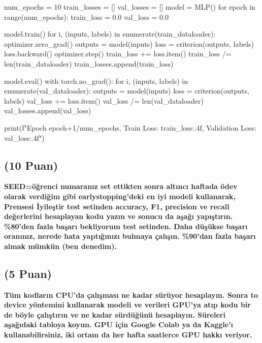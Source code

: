 \documentclass[11pt]{article}
\begin{document}
\begin{python}

 num_epochs = 10
train_losses = []
val_losses = []
model = MLP()
for epoch in range(num_epochs):
    train_loss = 0.0
    val_loss = 0.0
    
    
    model.train()
    for i, (inputs, labels) in enumerate(train_dataloader):
        optimizer.zero_grad()
        outputs = model(inputs)
        loss = criterion(outputs, labels)
        loss.backward()
        optimizer.step()
        train_loss += loss.item()
    train_loss /= len(train_dataloader)
    train_losses.append(train_loss)

    
    model.eval()
    with torch.no_grad():
        for i, (inputs, labels) in enumerate(val_dataloader):
            outputs = model(inputs)
            loss = criterion(outputs, labels)
            val_loss += loss.item()
        val_loss /= len(val_dataloader)
        val_losses.append(val_loss)

   
    print(f"Epoch {epoch+1}/{num_epochs}, Train Loss: {train_loss:.4f}, Validation Loss: {val_loss:.4f}")



\end{python}

\begin{comment}

\begin{figure}[ht!]
 
\end{figure}
\end{comment}

\subsection{(10 Puan)} \textbf{SEED=öğrenci numaranız set ettikten sonra altıncı haftada ödev olarak verdiğim gibi earlystopping'deki en iyi modeli kullanarak, Prensesi İyileştir test setinden accuracy, F1, precision ve recall değerlerini hesaplayan kodu yazın ve sonucu da aşağı yapıştırın. \%80'den fazla başarı bekliyorum test setinden. Daha düşükse başarı oranınız, nerede hata yaptığınızı bulmaya çalışın. \%90'dan fazla başarı almak mümkün (ben denedim).}

\begin{python}

\end{python}



\subsection{(5 Puan)} \textbf{Tüm kodların CPU'da çalışması ne kadar sürüyor hesaplayın. Sonra to device yöntemini kullanarak modeli ve verileri GPU'ya atıp kodu bir de böyle çalıştırın ve ne kadar sürdüğünü hesaplayın. Süreleri aşağıdaki tabloya koyun. GPU için Google Colab ya da Kaggle'ı kullanabilirsiniz, iki ortam da her hafta saatlerce GPU hakkı veriyor.}
\end{document}
